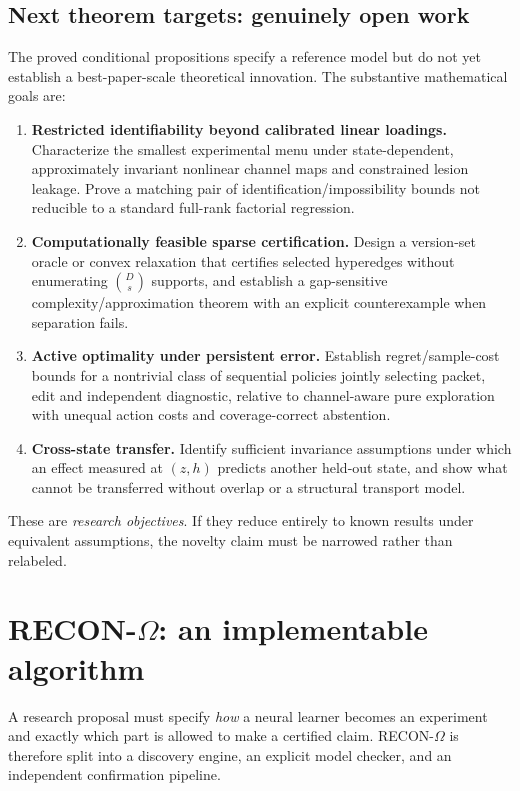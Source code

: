 \documentclass[11pt,a4paper]{article}
\theoremstyle{definition}\newtheorem{definition}[theorem]{Definition}
\theoremstyle{remark}\newtheorem{remark}[theorem]{Remark}
\begin{document}
\subsection{Next theorem targets: genuinely open work}
The proved conditional propositions specify a reference model but do not yet establish a best-paper-scale theoretical innovation. The substantive mathematical goals are:
\begin{enumerate}
\item \textbf{Restricted identifiability beyond calibrated linear loadings.} Characterize the smallest experimental menu under state-dependent, approximately invariant nonlinear channel maps and constrained lesion leakage. Prove a matching pair of identification/impossibility bounds not reducible to a standard full-rank factorial regression.
\item \textbf{Computationally feasible sparse certification.} Design a version-set oracle or convex relaxation that certifies selected hyperedges without enumerating $\binom{D}{s}$ supports, and establish a gap-sensitive complexity/approximation theorem with an explicit counterexample when separation fails.
\item \textbf{Active optimality under persistent error.} Establish regret/sample-cost bounds for a nontrivial class of sequential policies jointly selecting packet, edit and independent diagnostic, relative to channel-aware pure exploration with unequal action costs and coverage-correct abstention.
\item \textbf{Cross-state transfer.} Identify sufficient invariance assumptions under which an effect measured at $(z,h)$ predicts another held-out state, and show what cannot be transferred without overlap or a structural transport model.
\end{enumerate}
These are \emph{research objectives}. If they reduce entirely to known results under equivalent assumptions, the novelty claim must be narrowed rather than relabeled.

\section{RECON-$\Omega$: an implementable algorithm}\label{sec:algorithm}
A research proposal must specify \emph{how} a neural learner becomes an experiment and exactly which part is allowed to make a certified claim. RECON-$\Omega$ is therefore split into a discovery engine, an explicit model checker, and an independent confirmation pipeline.
\end{document}
